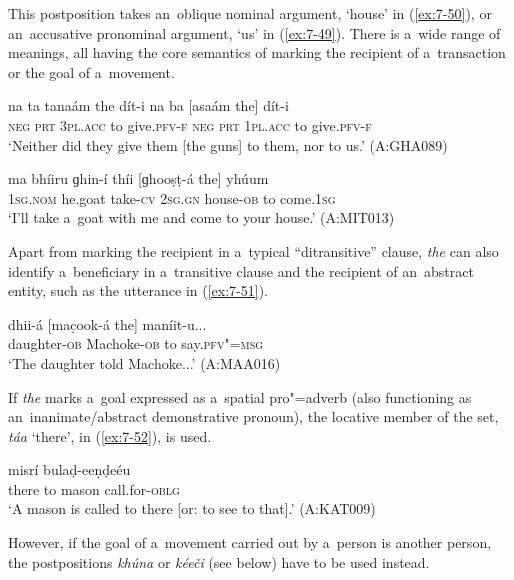  This postposition takes an~oblique nominal argument, `house' in (\ref{ex:7-50}), or an~accusative pronominal argument, `us' in (\ref{ex:7-49}). There is a~wide range of meanings, all having the core semantics of marking the recipient of a~transaction or the goal of a~movement. 
\begin{exe}
\ex
\label{ex:7-49}
\gll na ta tanaám the dít-i na ba  [asaám the] dít-i \\
\textsc{neg} \textsc{prt} \textsc{3pl.acc} to give.\textsc{pfv-f} \textsc{neg} \textsc{prt} \textsc{1pl.acc} to give.\textsc{pfv-f} \\
\glt `Neither did they give them [the guns] to them, nor to us.' (A:GHA089)
\end{exe}
\begin{exe}
\ex
\label{ex:7-50}
\gll ma bhíiru ɡhin-í thíi [ɡhooṣṭ-á the] yhúum \\
\textsc{1sg.nom} he.goat take-\textsc{cv} \textsc{2sg.gn} house-\textsc{ob} to come.\textsc{1sg} \\
\glt `I'll take a~goat with me and come to your house.' (A:MIT013)
\end{exe}

Apart from marking the recipient in a~typical ``ditransitive'' clause, \textit{the} can also identify a~beneficiary in a~transitive clause and the recipient of an~abstract entity, such as the utterance in (\ref{ex:7-51}). 

\begin{exe}
\ex
\label{ex:7-51}
\gll dhii-á [mac̣ook-á the] maníit-u... \\
daughter-\textsc{ob} Machoke-\textsc{ob} to say.\textsc{pfv"=msg} \\
\glt `The daughter told Machoke...' (A:MAA016)
\end{exe}

If \textit{the} marks a~goal expressed as a~spatial pro"=adverb (also functioning as an~inanimate/abstract demonstrative pronoun), the locative member of the set, \textit{táa} `there', in (\ref{ex:7-52}), is used.

\begin{exe}
\ex
\label{ex:7-52}
 misrí bulaḍ-eeṇḍeéu \\
there to mason call.for-\textsc{oblg}\\
\glt `A mason is called to there [or: to see to that].' (A:KAT009)
\end{exe}

However, if the goal of a~movement carried out by a~person is another person, the postpositions \textit{khúna} or \textit{kéeči} (see below) have to be used instead.


